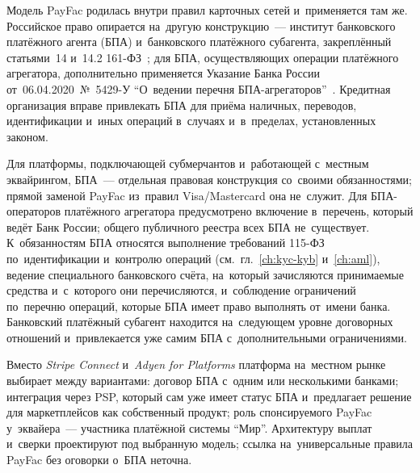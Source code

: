 Модель PayFac родилась внутри правил карточных сетей и~применяется там же.
Российское право опирается на~другую конструкцию~--- институт банковского
платёжного агента (БПА) и~банковского платёжного субагента, закреплённый
статьями~14 и~14.2 161-ФЗ~\cite{fz-161}; для БПА, осуществляющих операции
платёжного агрегатора, дополнительно применяется Указание Банка России
от~06.04.2020~№~5429-У \enquote{О~ведении перечня
БПА-агрегаторов}~\cite{cbr-5429u}. Кредитная организация вправе привлекать БПА
для приёма наличных, переводов, идентификации и~иных операций в~случаях
и~в~пределах, установленных законом.

Для платформы, подключающей субмерчантов и~работающей с~местным эквайрингом,
БПА~--- отдельная правовая конструкция со~своими обязанностями; прямой заменой
PayFac из~правил Visa/Mastercard она не~служит. Для БПА-операторов платёжного
агрегатора предусмотрено включение в~перечень, который ведёт Банк России;
общего публичного реестра всех БПА не~существует. К~обязанностям БПА относятся
выполнение требований 115-ФЗ по~идентификации и~контролю операций
(см.~гл.~\ref{ch:kyc-kyb} и~\ref{ch:aml}), ведение специального банковского
счёта, на~который зачисляются принимаемые средства и~с~которого они
перечисляются, и~соблюдение ограничений по~перечню операций, которые БПА имеет
право выполнять от~имени банка. Банковский платёжный субагент находится
на~следующем уровне договорных отношений и~привлекается уже самим БПА
с~дополнительными ограничениями.

Вместо \textit{Stripe Connect} и~\textit{Adyen for Platforms} платформа
на~местном рынке выбирает между вариантами: договор БПА с~одним или
несколькими банками; интеграция через PSP, который сам уже имеет статус БПА
и~предлагает решение для маркетплейсов как собственный продукт; роль
спонсируемого PayFac у~эквайера~--- участника платёжной системы \enquote{Мир}.
Архитектуру выплат и~сверки проектируют под выбранную модель; ссылка
на~универсальные правила PayFac без оговорки о~БПА неточна.

